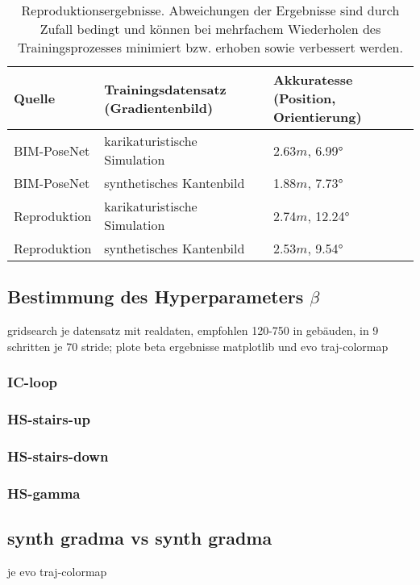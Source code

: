 \begin{table}[H]
	\centering
	\caption{Reproduktionsergebnisse. Abweichungen der Ergebnisse sind durch Zufall bedingt und können bei mehrfachem Wiederholen des Trainingsprozesses minimiert bzw. erhoben sowie verbessert werden. }
	\begin{tabularx}{1.0\textwidth}{>{\hsize=0.7\hsize}X >{\hsize=1.3\hsize}X X}
		\textbf{Quelle} & \textbf{Trainingsdatensatz} \hspace{2cm} (Gradientenbild)& \textbf{Akkuratesse} \hspace{2cm} (Position, Orientierung)\\
		\hline
		BIM-PoseNet & karikaturistische Simulation & 2.63$m$, 6.99°\\
		\hline
		BIM-PoseNet & synthetisches Kantenbild & 1.88$m$, 7.73°\\
		\hline
		Reproduktion & karikaturistische Simulation & 2.74$m$, 12.24°\\
		\hline
		Reproduktion & synthetisches Kantenbild & 2.53$m$, 9.54°\\
	\end{tabularx}
	\label{tab:reproduction}
\end{table}



\subsection{Bestimmung des Hyperparameters $\beta$}
\label{subsec:determine_beta}
gridsearch je datensatz mit realdaten, empfohlen 120-750 in gebäuden, in 9 schritten je 70 stride; plote beta ergebnisse matplotlib und evo traj-colormap
\subsubsection{IC-loop}
\subsubsection{HS-stairs-up}
\subsubsection{HS-stairs-down}
\subsubsection{HS-gamma}

\subsection{synth gradma vs synth gradma}
je evo traj-colormap
